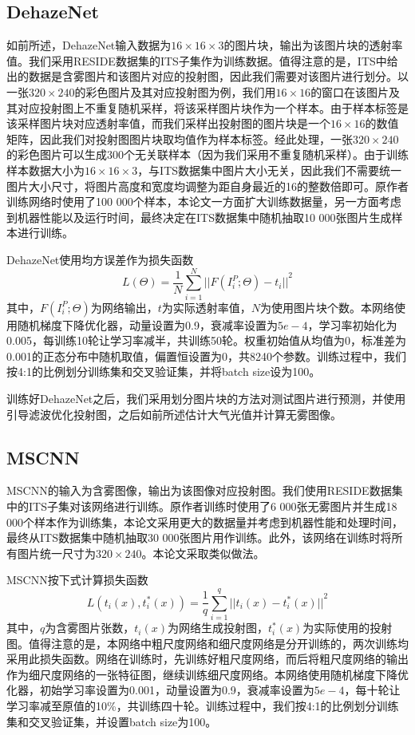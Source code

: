\documentclass[a4paper, 12pt, oneside]{report}
\begin{document}
{\subsection{DehazeNet\quad}
如前所述，DehazeNet输入数据为$16 \times 16 \times 3$的图片块，输出为该图片块的透射率值。我们采用RESIDE数据集的ITS子集作为训练数据。值得注意的是，ITS中给出的数据是含雾图片和该图片对应的投射图，因此我们需要对该图片进行划分。以一张$320 \times 240$的彩色图片及其对应投射图为例，我们用$16 \times 16$的窗口在该图片及其对应投射图上不重复随机采样，将该采样图片块作为一个样本。由于样本标签是该采样图片块对应透射率值，而我们采样出投射图的图片块是一个$16 \times 16$的数值矩阵，因此我们对投射图图片块取均值作为样本标签。经此处理，一张$320 \times 240$的彩色图片可以生成300个无关联样本（因为我们采用不重复随机采样）。由于训练样本数据大小为$16 \times 16 \times 3$，与ITS数据集中图片大小无关，因此我们不需要统一图片大小尺寸，将图片高度和宽度均调整为距自身最近的16的整数倍即可。原作者训练网络时使用了100 000个样本，本论文一方面扩大训练数据量，另一方面考虑到机器性能以及运行时间，最终决定在ITS数据集中随机抽取10 000张图片生成样本进行训练。
	
DehazeNet使用均方误差作为损失函数
\begin{equation}
L(\Theta) = \frac{1}{N}\sum_{i = 1}^N {||F(I_i^P; \Theta) - t_i||}^2
\end{equation}
其中，$F(I_i^P; \Theta)$为网络输出，$t$为实际透射率值，$N$为使用图片块个数。本网络使用随机梯度下降优化器，动量设置为0.9，衰减率设置为$5e-4$，学习率初始化为0.005，每训练10轮让学习率减半，共训练50轮。权重初始值从均值为0，标准差为0.001的正态分布中随机取值，偏置恒设置为0，共8240个参数。训练过程中，我们按4:1的比例划分训练集和交叉验证集，并将batch size设为100。

训练好DehazeNet之后，我们采用划分图片块的方法对测试图片进行预测，并使用引导滤波优化投射图，之后如前所述估计大气光值并计算无雾图像。

\subsection{MSCNN\quad}
MSCNN的输入为含雾图像，输出为该图像对应投射图。我们使用RESIDE数据集中的ITS子集对该网络进行训练。原作者训练时使用了6 000张无雾图片并生成18 000个样本作为训练集，本论文采用更大的数据量并考虑到机器性能和处理时间，最终从ITS数据集中随机抽取30 000张图片用作训练。此外，该网络在训练时将所有图片统一尺寸为$320 \times 240$。本论文采取类似做法。

MSCNN按下式计算损失函数
\begin{equation}
L(t_i(x), t_i^{\ast}(x)) = \frac{1}{q}\sum_{i = 1}^q {||t_i(x) - t_i^{\ast}(x)||}^2
\end{equation}
其中，$q$为含雾图片张数，$t_i(x)$为网络生成投射图，$t_i^{\ast}(x)$为实际使用的投射图。值得注意的是，本网络中粗尺度网络和细尺度网络是分开训练的，两次训练均采用此损失函数。网络在训练时，先训练好粗尺度网络，而后将粗尺度网络的输出作为细尺度网络的一张特征图，继续训练细尺度网络。本网络使用随机梯度下降优化器，初始学习率设置为0.001，动量设置为0.9，衰减率设置为$5e-4$，每十轮让学习率减至原值的10\%，共训练四十轮。训练过程中，我们按4:1的比例划分训练集和交叉验证集，并设置batch size为100。

}
\end{document}
